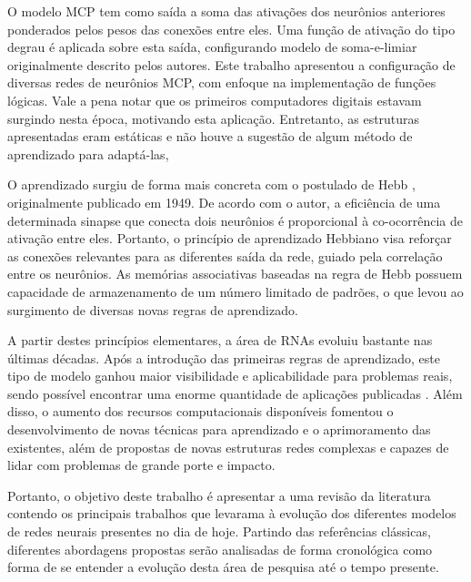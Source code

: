 \documentclass[conference]{IEEEtran}
\begin{document}
	O modelo MCP tem como saída a soma das ativações dos neurônios anteriores ponderados pelos pesos das conexões entre eles. Uma função de ativação do tipo degrau é aplicada sobre esta saída, configurando modelo de soma-e-limiar originalmente descrito pelos autores. Este trabalho apresentou a configuração de diversas redes de neurônios MCP, com enfoque na implementação de funções lógicas. Vale a pena notar que os primeiros computadores digitais estavam surgindo nesta época, motivando esta aplicação. Entretanto, as estruturas apresentadas eram estáticas e não houve a sugestão de algum método de aprendizado para adaptá-las,
	
	O aprendizado surgiu de forma mais concreta com o postulado de Hebb \cite{hebb2005organization}, originalmente publicado em 1949. De acordo com o autor, a eficiência de uma determinada sinapse que conecta dois neurônios é proporcional à co-ocorrência de ativação entre eles. Portanto, o princípio de aprendizado Hebbiano visa reforçar as conexões relevantes para as diferentes saída da rede, guiado pela correlação entre os neurônios. As memórias associativas baseadas na regra de Hebb possuem capacidade de armazenamento de um número limitado de padrões, o que levou ao surgimento de diversas novas regras de aprendizado.
	
	A partir destes princípios elementares, a área de RNAs evoluiu bastante nas últimas décadas. Após a introdução das primeiras regras de aprendizado, este tipo de modelo ganhou maior visibilidade e aplicabilidade para problemas reais, sendo possível encontrar uma enorme quantidade de aplicações publicadas \cite{abiodun2018state}. Além disso, o aumento dos recursos computacionais disponíveis fomentou o desenvolvimento de novas técnicas para aprendizado e o aprimoramento das existentes, além de propostas de novas estruturas redes complexas e capazes de lidar com problemas de grande porte e impacto.
	
	Portanto, o objetivo deste trabalho é apresentar a uma revisão da literatura contendo os principais trabalhos que levarama à evolução dos diferentes modelos de redes neurais presentes no dia de hoje. Partindo das referências clássicas, diferentes abordagens propostas serão analisadas de forma cronológica como forma de se entender a evolução desta área de pesquisa até o tempo presente. 
		
	
\end{document}
